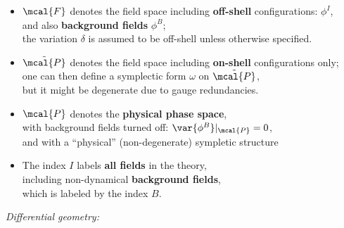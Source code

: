\documentclass[a4paper
	,10pt
]{article}
\begin{document}
	\begin{itemize}
	\item $\mcal{F}$ denotes the field space including \textbf{off-shell} configurations: $\phi^I$,\\
	and also \textbf{background fields} $\phi^B$; \\
	the variation $\delta$ is assumed to be off-shell unless otherwise specified.
	
	\item $\tilde{\mcal{P}}$ denotes the field space including \textbf{on-shell} configurations only; \\
	one can then define a symplectic form $\omega$ on $\tilde{\mcal{P}}$, \\
	but it might be degenerate due to gauge redundancies.
	
	\item $\mcal{P}$ denotes the \textbf{physical phase space}, \\
	with background fields turned off: $\var{\phi^B}|_{\mcal{P}} = 0$, \\
	and with a ``physical'' (non-degenerate) sympletic structure
	
	\item The index $I$ labels \textbf{all fields} in the theory, \\
	including non-dynamical \textbf{background fields}, \\
	which is labeled by the index $B$.
	
	\end{itemize}
\smallskip
\textit{Differential geometry:}
	
\end{document}
